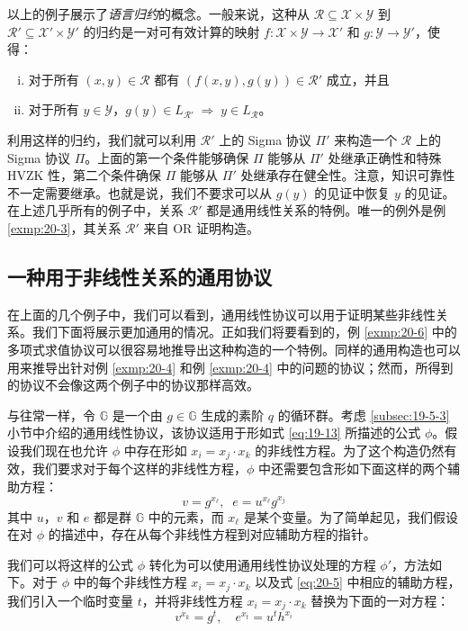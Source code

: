 以上的例子展示了\emph{语言归约}的概念。一般来说，这种从 $\mathcal{R}\subseteq\mathcal{X}\times\mathcal{Y}$ 到 $\mathcal{R}'\subseteq\mathcal{X}'\times\mathcal{Y}'$ 的归约是一对可有效计算的映射 $f:\mathcal{X}\times\mathcal{Y}\to\mathcal{X}'$ 和 $g:\mathcal{Y}\to\mathcal{Y}'$，使得：
\begin{enumerate}[(i)]
	\item 对于所有 $(x,y)\in\mathcal{R}$ 都有 $(f(x,y),g(y))\in\mathcal{R}'$ 成立，并且
	\item 对于所有 $y\in\mathcal{Y}$，$g(y)\in L_{\mathcal{R}'}\; \Longrightarrow\; y\in L_{\mathcal R}$。
\end{enumerate}
利用这样的归约，我们就可以利用 $\mathcal{R}'$ 上的 Sigma 协议 $\Pi'$ 来构造一个 $\mathcal{R}$ 上的 Sigma 协议 $\Pi$。上面的第一个条件能够确保 $\Pi$ 能够从 $\Pi'$ 处继承正确性和特殊 HVZK 性，第二个条件确保 $\Pi$ 能够从 $\Pi'$ 处继承存在健全性。注意，知识可靠性不一定需要继承。也就是说，我们不要求可以从 $g(y)$ 的见证中恢复 $y$ 的见证。在上述几乎所有的例子中，关系 $\mathcal{R}'$ 都是通用线性关系的特例。唯一的例外是例 \ref{exmp:20-3}，其关系 $\mathcal{R}'$ 来自 OR 证明构造。

\subsection{一种用于非线性关系的通用协议}\label{subsec:20-2-1}

在上面的几个例子中，我们可以看到，通用线性协议可以用于证明某些非线性关系。我们下面将展示更加通用的情况。正如我们将要看到的，例 \ref{exmp:20-6} 中的多项式求值协议可以很容易地推导出这种构造的一个特例。同样的通用构造也可以用来推导出针对例 \ref{exmp:20-4} 和例 \ref{exmp:20-4} 中的问题的协议；然而，所得到的协议不会像这两个例子中的协议那样高效。

与往常一样，令 $\mathbb{G}$ 是一个由 $g\in\mathbb{G}$ 生成的素阶 $q$ 的循环群。考虑 \ref{subsec:19-5-3} 小节中介绍的通用线性协议，该协议适用于形如式 \ref{eq:19-13} 所描述的公式 $\phi$。假设我们现在也允许 $\phi$ 中存在形如 $x_i=x_j\cdot x_k$ 的非线性方程。为了这个构造仍然有效，我们要求对于每个这样的非线性方程，$\phi$ 中还需要包含形如下面这样的两个辅助方程：
\begin{equation}\label{eq:20-5}
v=g^{x_\ell},\;\;
e=u^{x_\ell}g^{x_j}
\end{equation}
其中 $u$，$v$ 和 $e$ 都是群 $\mathbb{G}$ 中的元素，而 $x_\ell$ 是某个变量。为了简单起见，我们假设在对 $\phi$ 的描述中，存在从每个非线性方程到对应辅助方程的指针。

我们可以将这样的公式 $\phi$ 转化为可以使用通用线性协议处理的方程 $\phi'$，方法如下。对于 $\phi$ 中的每个非线性方程 $x_i=x_j\cdot x_k$ 以及式 \ref{eq:20-5} 中相应的辅助方程，我们引入一个临时变量 $t$，并将非线性方程 $x_i=x_j\cdot x_k$ 替换为下面的一对方程：
\begin{equation}\label{eq:20-6}
v^{x_k}=g^t,
\quad
e^{x_t}=u^th^{x_i}
\end{equation}

